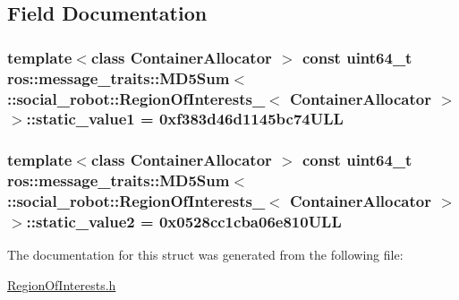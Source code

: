 \subsection{Field Documentation}
\hypertarget{structros_1_1message__traits_1_1MD5Sum_3_01_1_1social__robot_1_1RegionOfInterests___3_01ContainerAllocator_01_4_01_4_afdf715607f94e9813124b1ef2e644f89}{
\subsubsection[{static\_\-value1}]{\setlength{\rightskip}{0pt plus 5cm}template$<$class ContainerAllocator $>$ const uint64\_\-t ros::message\_\-traits::MD5Sum$<$ ::{\bf social\_\-robot::RegionOfInterests\_\-}$<$ ContainerAllocator $>$ $>$::{\bf static\_\-value1} = 0xf383d46d1145bc74ULL}}
\label{structros_1_1message__traits_1_1MD5Sum_3_01_1_1social__robot_1_1RegionOfInterests___3_01ContainerAllocator_01_4_01_4_afdf715607f94e9813124b1ef2e644f89}
\hypertarget{structros_1_1message__traits_1_1MD5Sum_3_01_1_1social__robot_1_1RegionOfInterests___3_01ContainerAllocator_01_4_01_4_ab6022a7120718d5b35a604cccdbd3f03}{
\subsubsection[{static\_\-value2}]{\setlength{\rightskip}{0pt plus 5cm}template$<$class ContainerAllocator $>$ const uint64\_\-t ros::message\_\-traits::MD5Sum$<$ ::{\bf social\_\-robot::RegionOfInterests\_\-}$<$ ContainerAllocator $>$ $>$::{\bf static\_\-value2} = 0x0528cc1cba06e810ULL}}
\label{structros_1_1message__traits_1_1MD5Sum_3_01_1_1social__robot_1_1RegionOfInterests___3_01ContainerAllocator_01_4_01_4_ab6022a7120718d5b35a604cccdbd3f03}


The documentation for this struct was generated from the following file:\begin{DoxyCompactItemize}
\item 
\hyperlink{RegionOfInterests_8h}{RegionOfInterests.h}\end{DoxyCompactItemize}
